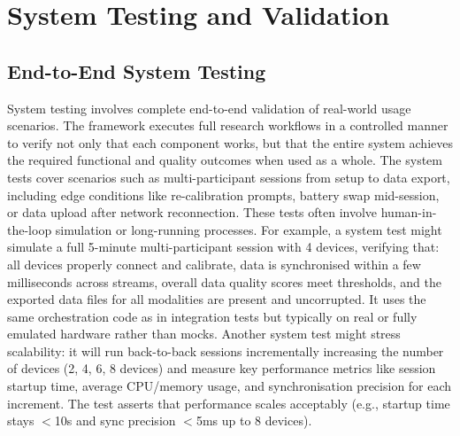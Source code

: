 \documentclass[11pt,a4paper]{report}
\begin{document}
\section{System Testing and Validation}
\subsection{End-to-End System Testing}
System testing involves complete end-to-end validation of real-world usage scenarios. The framework executes full research workflows in a controlled manner to verify not only that each component works, but that the entire system achieves the required functional and quality outcomes when used as a whole.
The system tests cover scenarios such as multi-participant sessions from setup to data export, including edge conditions like re-calibration prompts, battery swap mid-session, or data upload after network reconnection. These tests often involve human-in-the-loop simulation or long-running processes.
For example, a system test might simulate a full 5-minute multi-participant session with 4 devices, verifying that: all devices properly connect and calibrate, data is synchronised within a few milliseconds across streams, overall data quality scores meet thresholds, and the exported data files for all modalities are present and uncorrupted. It uses the same orchestration code as in integration tests but typically on real or fully emulated hardware rather than mocks.
Another system test might stress scalability: it will run back-to-back sessions incrementally increasing the number of devices (2, 4, 6, 8 devices) and measure key performance metrics like session startup time, average CPU/memory usage, and synchronisation precision for each increment. The test asserts that performance scales acceptably (e.g., startup time stays $<$10s and sync precision $<$5ms up to 8 devices).
\end{document}
